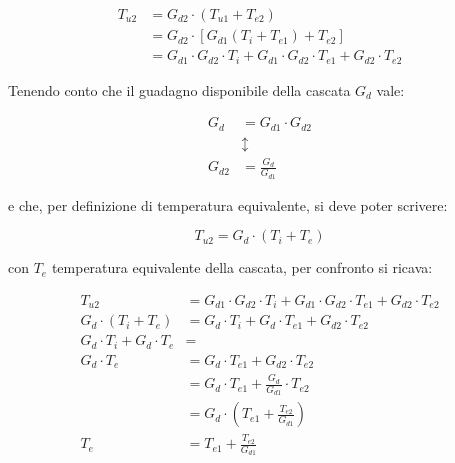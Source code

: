 {
    \Large 
    \begin{equation}
        \begin{split}
            T_{u2}
            &= 
            G_{d2} \cdot (T_{u1} + T_{e2})
            \\
            &= 
            G_{d2} \cdot [G_{d1} (T_i + T_{e1}) + T_{e2}]
            \\
            &=
            G_{d1} \cdot G_{d2} \cdot T_i 
            + 
            G_{d1} \cdot G_{d2} \cdot T_{e1} 
            + 
            G_{d2} \cdot T_{e2}
        \end{split}
    \end{equation}
}


Tenendo conto che il guadagno disponibile della cascata $G_d$ vale: 

{
    \Large 
    \begin{equation}
        \begin{split}
            G_d &= G_{d1} \cdot G_{d2}
            \\ 
            &\updownarrow
            \\
            G_{d2} &= \frac{G_d}{G_{d1}}
        \end{split}
    \end{equation}
}

e che, per definizione di temperatura equivalente, si deve poter scrivere: 

{
    \Large 
    \begin{equation}
        T_{u2} = G_d \cdot (T_i + T_e)
    \end{equation}
}

con $T_e$ temperatura equivalente della cascata, per confronto si ricava: 

{
    \Large 
    \begin{equation}
        \begin{split}
            T_{u2}
            &=
            G_{d1} \cdot G_{d2} \cdot T_i 
            + 
            G_{d1} \cdot G_{d2} \cdot T_{e1} 
            + 
            G_{d2} \cdot T_{e2}
            \\
            G_d \cdot (T_i + T_e)
            &=
            G_d \cdot T_i
            + 
            G_d \cdot T_{e1}
            + 
            G_{d2} \cdot T_{e2}
            \\
            G_d \cdot T_i + G_d \cdot T_e 
            &=
            \\
            G_d \cdot T_e 
            &=
            G_d \cdot T_{e1} + G_{d2} \cdot T_{e2}
            \\
            &= 
            G_d \cdot T_{e1} + \frac{G_d}{G_{d1}} \cdot T_{e2}
            \\
            &= 
            G_d \cdot (T_{e1} + \frac{T_{e2}}{G_{d1}})
            \\
            T_e
            &=
            T_{e1} + \frac{T_{e2}}{G_{d1}}
        \end{split}
    \end{equation}
}

